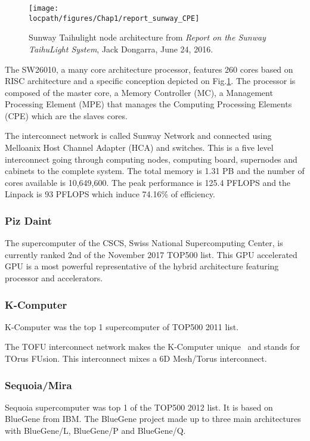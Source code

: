 \begin{figure}
\centering
\texttt{[image: \\locpath/figures/Chap1/report\_sunway\_CPE]}
\caption{Sunway Taihulight node architecture from \textit{Report on the Sunway TaihuLight System}, Jack Dongarra, June 24, 2016.}
\label{fig:chap1_report_sunway_CPE}
\end{figure}

The SW26010, a many core architecture processor, features 260 cores based on RISC architecture and a specific conception depicted on Fig.\ref{fig:chap1_report_sunway_CPE}. 
The processor is composed of the master core, a Memory Controller (MC), a Management Processing Element (MPE) that manages the Computing Processing Elements (CPE) which are the slaves cores. 

The interconnect network is called Sunway Network and connected using Melloanix Host Channel Adapter (HCA) and switches. 
This is a five level interconnect going through computing nodes, computing board, supernodes and cabinets to the complete system.
The total memory is 1.31 PB and the number of cores available is 10,649,600.
The peak performance is 125.4 PFLOPS and the Linpack is 93 PFLOPS which induce 74.16\% of efficiency. 

\subsubsection{Piz Daint}
The supercomputer of the CSCS, Swiss National Supercomputing Center, is currently ranked 2nd of the November 2017 TOP500 list. 
This GPU accelerated GPU is a most powerful representative of the hybrid architecture featuring processor and accelerators. 

\subsubsection{K-Computer}
K-Computer was the top 1 supercomputer of TOP500 2011 list. 

The TOFU interconnect network makes the K-Computer unique~\cite{ajima2009tofu} and stands for TOrus FUsion.
This interconnect mixes a 6D Mesh/Torus interconnect.


\subsubsection{Sequoia/Mira}
Sequoia supercomputer was top 1 of the TOP500 2012 list. 
It is based on BlueGene from IBM.
The BlueGene project made up to three main architectures with BlueGene/L, BlueGene/P and BlueGene/Q.

